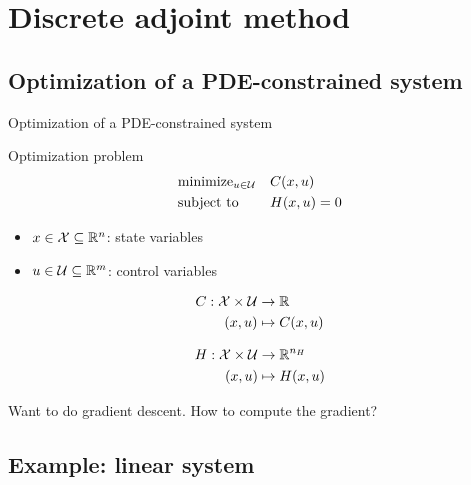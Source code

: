 \section{Discrete adjoint method}

\subsection{Optimization of a PDE-constrained system}


\begin{frame}{Optimization of a PDE-constrained system}

\begin{block}{Optimization problem}
\[
\begin{aligned}
&\text{minimize}_{u \in \mathcal{U}} && C(x,u) \\
&\text{subject to} &&H(x,u) = 0
\end{aligned}
\]
\end{block}

\begin{itemize}
\item $x \in \mathcal{X} \subseteq \mathbb{R}^n$: state variables
\item $u \in \mathcal{U}  \subseteq \mathbb{R}^m$: control variables
\end{itemize}


\[
\begin{aligned}
C: \mathcal{X} \times \mathcal{U} & \rightarrow \mathbb{R}\\
(x,u) & \mapsto C(x,u)
\end{aligned}
\]

\[
\begin{aligned}
H: \mathcal{X} \times \mathcal{U} & \rightarrow \mathbb{R}^{n_H}\\
(x,u) & \mapsto H(x,u)
\end{aligned}
\]

Want to do gradient descent. How to compute the gradient?
\end{frame}


\subsection{Example: linear system}

